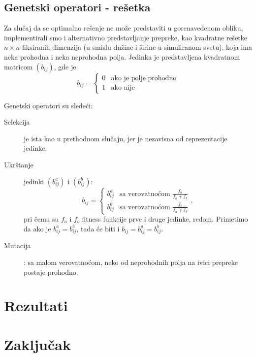 \documentclass[12pt]{article}
\begin{document}
\subsection{Genetski operatori - rešetka}

Za slučaj da se optimalno rešenje ne može predstaviti u gorenavedenom obliku, implementirali smo i alternativno predstavljanje prepreke, kao kvadratne rešetke $n\times n$ fiksiranih dimenzija (u smislu dužine i širine u simuliranom svetu), koja ima neka prohodna i neka neprohodna polja. Jedinka je predstavljena kvadratnom matricom $(b_{ij})$, gde je
$$
b_{ij} = 
\begin{cases}
    0 & \text{ako je polje prohodno}\\
    1 & \text{ako nije}
\end{cases}
$$

Genetski operatori su sledeći:
\begin{description}
\item[Selekcija] je ista kao u prethodnom slučaju, jer je nezavisna od reprezentacije jedinke.
\item[Ukrštanje] jedinki $(b^a_{ij})$ i $(b^b_{ij})$:
$$
b_{ij} = 
\begin{cases}
    b^a_{ij} & \text{sa verovatnoćom } \frac{f_a}{f_a+f_b}\\
    b^b_{ij} & \text{sa verovatnoćom } \frac{f_b}{f_a+f_b}
\end{cases},
$$
pri čemu su $f_a$ i $f_b$ fitness funkcije prve i druge jedinke, redom. Primetimo da ako je $ b^a_{ij} = b^b_{ij}$, tada će biti i $b_{ij} = b^a_{ij} = b^b_{ij}$.
\item[Mutacija]: sa malom verovatnoćom, neko od neprohodnih polja na ivici prepreke postaje prohodno.
\end{description}

\section{Rezultati}

\section{Zaključak}


  
\begin{scriptsize}

\end{scriptsize}
\end{document}
